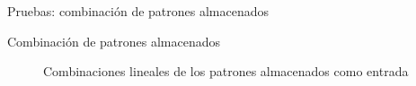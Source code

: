 \documentclass{beamer}
\begin{document}
\begin{frame}{Pruebas: combinación de patrones almacenados}
\begin{block}{Combinación de patrones almacenados}
\begin{figure}[h!]
 \centering
 
 \caption{Combinaciones lineales de los patrones almacenados como entrada}
 \label{Fig:mix}
\end{figure}
\end{block}
\end{frame}
\end{document}
